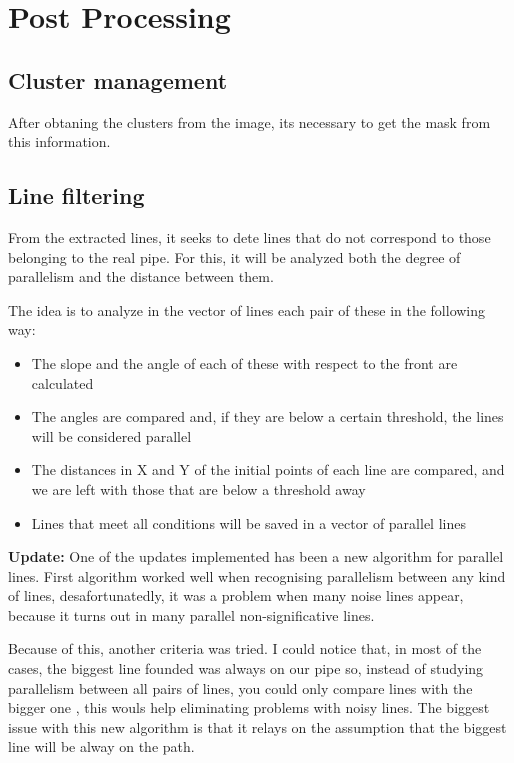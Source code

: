 \documentclass[12pt, a4paper]{article}
\begin{document}
\section{Post Processing}

\subsection{Cluster management}

After obtaning the clusters from the image, its necessary to get the mask from this
information. 

\subsection{Line filtering}


From the extracted lines, it seeks to dete lines that do not correspond to those belonging to the real pipe. For this, it will be analyzed
both the degree of parallelism and the distance between them.

The idea is to analyze in the vector of lines each pair of these in the following way:


\begin{itemize}

    \item The slope and the angle of each of these with respect to the front are calculated
    \item The angles are compared and, if they are below a certain threshold, the lines will be considered parallel
    \item The distances in X and Y of the initial points of each line are compared, and we are left with those that are below
    a threshold away
    \item Lines that meet all conditions will be saved in a vector of parallel lines
\end{itemize}

\textbf{Update:} One of the updates implemented has been a new algorithm for parallel lines. 
First algorithm worked well when recognising parallelism between any kind of lines, 
desafortunatedly, it was a problem when many noise lines appear, because it turns out in 
many parallel non-significative lines.

Because of this, another criteria was tried. I could notice that, in most of the cases, 
the biggest line founded was always on our pipe so, instead of studying parallelism between all
pairs of lines, you could only compare lines with the bigger one , this wouls help eliminating problems
with noisy lines. The biggest issue with this new algorithm is that it relays on the assumption that the 
biggest line will be alway on the path.
\end{document}
